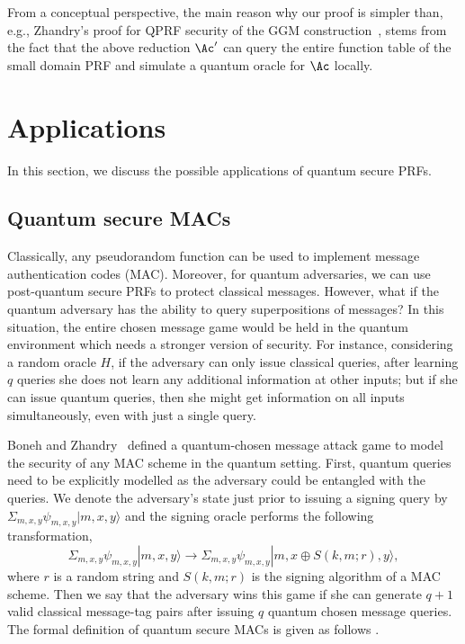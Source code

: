 From a conceptual perspective, the main reason why our proof is simpler than, e.g., Zhandry's proof for QPRF security of the GGM construction~\cite{FOCS:Zhandry12}, stems from the fact that the above reduction $\Ac'$ can query the entire function table of the small domain PRF and simulate a quantum oracle for $\Ac$ locally.

\section{Applications}

In this section, we discuss the possible applications of quantum secure PRFs.

\subsection{Quantum secure MACs}
Classically, any pseudorandom function can be used to implement message authentication codes (MAC). Moreover, for quantum adversaries, we can use post-quantum secure PRFs to protect classical messages. However, what if the quantum adversary has the ability to query superpositions of messages? In this situation, the entire chosen message game would be held in the quantum environment which needs a stronger version of security. For instance, considering a random oracle $H$, if the adversary can only issue classical queries, after learning $q$ queries she does not learn any additional information at other inputs; but if she can issue quantum queries, then she might get information on all inputs simultaneously, even with just a single query.

Boneh and Zhandry~\cite{EC:BonZha13} defined a quantum-chosen message attack game to model the security of any MAC scheme in the quantum setting.
First, quantum queries need to be explicitly modelled as the adversary could be entangled with the queries. We denote the adversary's state just prior to issuing a signing query by $\Sigma_{m,x,y} \psi_{m,x,y} |m,x,y\rangle$ and the signing oracle performs the following transformation,
$$
\Sigma_{m,x,y} \psi_{m,x,y} |m,x,y\rangle \to \Sigma_{m,x,y} \psi_{m,x,y} |m,x\oplus S(k,m;r),y\rangle,
$$
where $r$ is a random string and $S(k,m;r)$ is the signing algorithm of a MAC scheme. Then we say that the adversary wins this game if she can generate $q+1$ valid classical message-tag pairs after issuing $q$ quantum chosen message queries. The formal definition of quantum secure MACs is given as follows \footnotemark.



